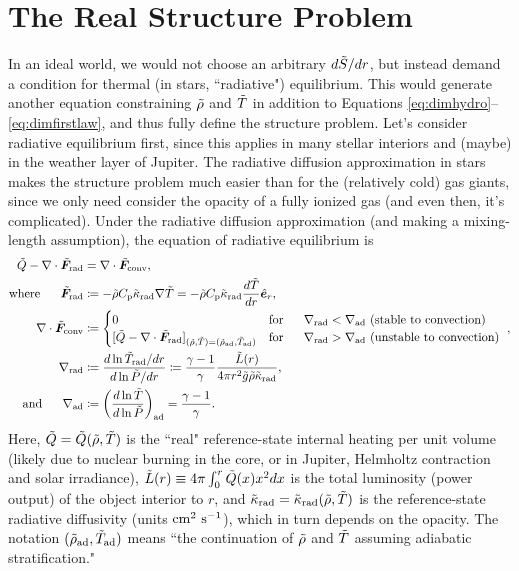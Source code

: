 \documentclass[12pt]{article}
\numberwithin{equation}{section}
\begin{document}
\section{The Real Structure Problem}\label{sec:refreal}
In an ideal world, we would not choose an arbitrary $d\tilde{S}/dr$, but instead demand a condition for thermal (in stars, ``radiative") equilibrium. This would generate another equation constraining $\tilde{\rho}$ and $\tilde{T}$ in addition to Equations \eqref{eq:dimhydro}--\eqref{eq:dimfirstlaw}, and thus fully define the structure problem. Let's consider radiative equilibrium first, since this applies in many stellar interiors and (maybe) in the weather layer of Jupiter. The radiative diffusion approximation in stars makes the structure problem much easier than for the (relatively cold) gas giants, since we only need consider the opacity of a fully ionized gas (and even then, it's complicated). Under the radiative diffusion approximation (and making a mixing-length assumption), the equation of radiative equilibrium is
\begin{subequations}\label{eq:dimradequil}
\begin{align}
	\heattilde - \Div\fradtilde &= \Div\fconvtilde\label{eq:dimradequil1},\\
	\where \fradtilde &\define  -\rhotilde \cpcap\kradtilde \nabla\tmptilde=-\rhotilde \cpcap\kradtilde \frac{d\tmptilde}{dr}\er,\label{eq:dimradequil2}\\
	 \Div\fconvtilde &\define \begin{cases} 0 \five &\text{for}\five \nabla_{\rm rad} <\nabla_{\rm ad}\ \text{(stable to convection)}\\
	[\heattilde - \Div\fradtilde]_{(\rhotilde,\tmptilde)=(\rhotilde_{\rm ad}, \tmptilde_{\rm ad})}&\text{for}\five \nabla_{\rm rad} >\nabla_{\rm ad}\ \text{(unstable to convection)}\
		\end{cases},\label{eq:dimradequil3}\\
		\nabla_{\rm rad}&\define \frac{d\ln\tmptilde_{\rm rad}/dr}{d\ln\prstilde/dr} \define \frac{\gamma-1}{\gamma}\frac{\lumtilde\ofr}{4\pi r^2 \gtilde \rhotilde \kradtilde},\label{eq:dimradequil4}\\
		\andd \nabla_{\rm ad}&\define  \left(\frac{d\ln\tmptilde}{d\ln\prstilde}\right)_{\rm ad} = \frac{\gamma-1}{\gamma}.
\end{align}
\end{subequations}
Here, $\tilde{Q}=\tilde{Q}(\tilde{\rho},\tilde{T})$ is the ``real" reference-state internal heating per unit volume (likely due to nuclear burning in the core, or in Jupiter, Helmholtz contraction and solar irradiance), $\tilde{L}(r)\equiv 4\pi\int_0^r \tilde{Q}(x) x^2dx$ is the total luminosity (power output) of the object interior to $r$, and $\tilde{\kappa}_{\rm rad}=\tilde{\kappa}_{\rm rad}(\tilde{\rho},\tilde{T})$ is the reference-state radiative diffusivity (units $\rm{cm^2\ s^{-1}}$), which in turn depends on the opacity. The notation $(\tilde{\rho}_{\rm ad}, \tilde{T}_{\rm ad})$ means ``the continuation of $\tilde{\rho}$ and $\tilde{T}$ assuming adiabatic stratification."
\end{document}
